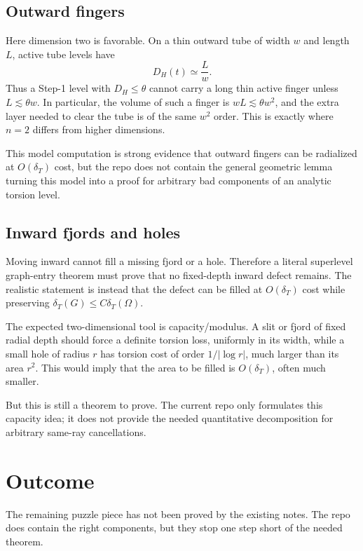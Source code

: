 \documentclass[11pt]{article}
\newcommand{\Om}{\Omega}
\newcommand{\dT}{\delta_T}
\begin{document}
\subsection{Outward fingers}

Here dimension two is favorable.  On a thin outward tube of width \(w\)
and length \(L\), active tube levels have
\[
   D_H(t)\simeq \frac{L}{w}.
\]
Thus a Step-1 level with \(D_H\le\theta\) cannot carry a long thin
active finger unless \(L\lesssim \theta w\).  In particular, the volume
of such a finger is \(wL\lesssim \theta w^2\), and the extra layer
needed to clear the tube is of the same \(w^2\) order.  This is exactly
where \(n=2\) differs from higher dimensions.

This model computation is strong evidence that outward fingers can be
radialized at \(O(\dT)\) cost, but the repo does not contain the
general geometric lemma turning this model into a proof for arbitrary
bad components of an analytic torsion level.

\subsection{Inward fjords and holes}

Moving inward cannot fill a missing fjord or a hole.  Therefore a
literal superlevel graph-entry theorem must prove that no fixed-depth
inward defect remains.  The realistic statement is instead that the
defect can be filled at \(O(\dT)\) cost while preserving
\(\dT(G)\le C\dT(\Om)\).

The expected two-dimensional tool is capacity/modulus.  A slit or fjord
of fixed radial depth should force a definite torsion loss, uniformly in
its width, while a small hole of radius \(r\) has torsion cost of order
\(1/|\log r|\), much larger than its area \(r^2\).  This would imply
that the area to be filled is \(O(\dT)\), often much smaller.

But this is still a theorem to prove.  The current repo only formulates
this capacity idea; it does not provide the needed quantitative
decomposition for arbitrary same-ray cancellations.

\section{Outcome}

The remaining puzzle piece has not been proved by the existing notes.
The repo does contain the right components, but they stop one step
short of the needed theorem.
\end{document}
